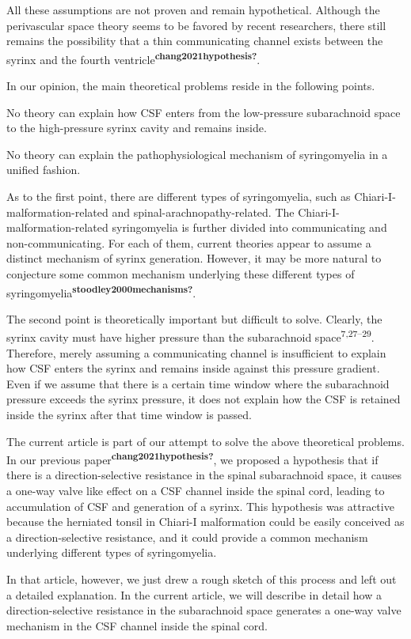 \documentclass[a4paper,12pt]{article}
\begin{document}
All these assumptions are not proven and remain hypothetical. Although the perivascular space theory seems to be favored by recent researchers, there still remains the possibility that a thin communicating channel exists between the syrinx and the fourth ventricle\textsuperscript{\textbf{chang2021hypothesis?}}.

In our opinion, the main theoretical problems reside in the following points.

No theory can explain how CSF enters from the low-pressure subarachnoid space to the high-pressure syrinx cavity and remains inside.

No theory can explain the pathophysiological mechanism of syringomyelia in a unified fashion.

As to the first point, there are different types of syringomyelia, such as Chiari-I-malformation-related and spinal-arachnopathy-related. The Chiari-I-malformation-related syringomyelia is further divided into communicating and non-communicating. For each of them, current theories appear to assume a distinct mechanism of syrinx generation. However, it may be more natural to conjecture some common mechanism underlying these different types of syringomyelia\textsuperscript{\textbf{stoodley2000mechanisms?}}.

The second point is theoretically important but difficult to solve. Clearly, the syrinx cavity must have higher pressure than the subarachnoid space\textsuperscript{7,27--29}. Therefore, merely assuming a communicating channel is insufficient to explain how CSF enters the syrinx and remains inside against this pressure gradient. Even if we assume that there is a certain time window where the subarachnoid pressure exceeds the syrinx pressure, it does not explain how the CSF is retained inside the syrinx after that time window is passed.

The current article is part of our attempt to solve the above theoretical problems. In our previous paper\textsuperscript{\textbf{chang2021hypothesis?}}, we proposed a hypothesis that if there is a direction-selective resistance in the spinal subarachnoid space, it causes a one-way valve like effect on a CSF channel inside the spinal cord, leading to accumulation of CSF and generation of a syrinx. This hypothesis was attractive because the herniated tonsil in Chiari-I malformation could be easily conceived as a direction-selective resistance, and it could provide a common mechanism underlying different types of syringomyelia.

In that article, however, we just drew a rough sketch of this process and left out a detailed explanation. In the current article, we will describe in detail how a direction-selective resistance in the subarachnoid space generates a one-way valve mechanism in the CSF channel inside the spinal cord.
\end{document}
